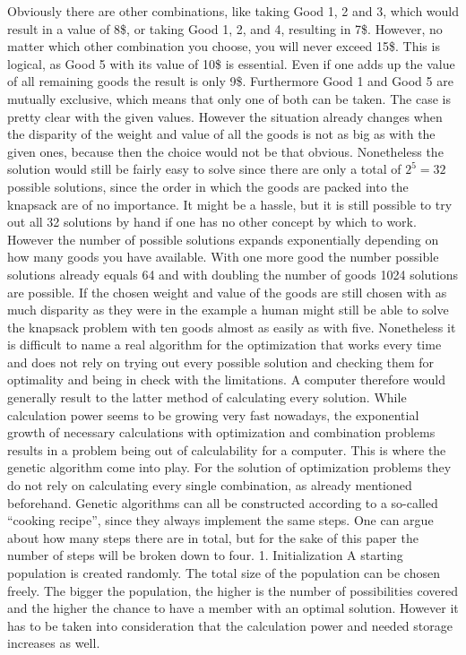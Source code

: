 \documentclass[11pt,a4paper]{article}
\begin{document}
Obviously there are other combinations, like taking Good 1, 2 and 3, which would result in a value of 8\$, or taking Good 1, 2, and 4, resulting in 7\$. However, no matter which other combination you choose, you will never exceed 15\$.
This is logical, as Good 5 with its value of 10\$ is essential. Even if one adds up the value of all remaining goods the result is only 9\$. Furthermore Good 1 and Good 5 are mutually exclusive, which means that only one of both can be taken. The case is pretty clear with the given values.
However the situation already changes when the disparity of the weight and value of all the goods is not as big as with the given ones, because then the choice would not be that obvious. Nonetheless the solution would still be fairly easy to solve since there are only a total of $2^5=32$ possible solutions, since the order in which the goods are packed into the knapsack are of no importance. It might be a hassle, but it is still possible to try out all 32 solutions by hand if one has no other concept by which to work.
However the number of possible solutions expands exponentially depending on how many goods you have available. With one more good the number possible solutions already equals 64 and with doubling the number of goods 1024 solutions are possible. If the chosen weight and value of the goods are still chosen with as much disparity as they were in the example a human might still be able to solve the knapsack problem with ten goods almost as easily as with five.
Nonetheless it is difficult to name a real algorithm for the optimization that works every time and does not rely on trying out every possible solution and checking them for optimality and being in check with the limitations. A computer therefore would generally result to the latter method of calculating every solution.
While calculation power seems to be growing very fast nowadays, the exponential growth of necessary calculations with optimization and combination problems results in a problem being out of calculability for a computer.
This is where the genetic algorithm come into play. For the solution of optimization problems they do not rely on calculating every single combination, as already mentioned beforehand.
Genetic algorithms can all be constructed according to a so-called “cooking recipe”, since they always implement the same steps. One can argue about how many steps there are in total, but for the sake of this paper the number of steps will be broken down to four.
1.    Initialization
A starting population is created randomly. The total size of the population can be chosen freely. The bigger the population, the higher is the number of possibilities covered and the higher the chance to have a member with an optimal solution. However it has to be taken into consideration that the calculation power and needed storage increases as well.
\end{document}
